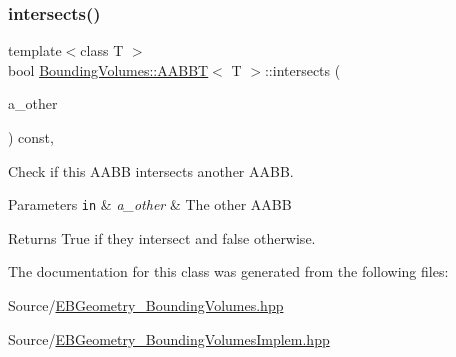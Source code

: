 \subsubsection{\texorpdfstring{intersects()}{intersects()}}
{\footnotesize\ttfamily template$<$class T $>$ \\
bool \hyperlink{classBoundingVolumes_1_1AABBT}{Bounding\+Volumes\+::\+A\+A\+B\+BT}$<$ T $>$\+::intersects (\begin{DoxyParamCaption}\item[{const \hyperlink{classBoundingVolumes_1_1AABBT}{A\+A\+B\+BT}$<$ T $>$ \&}]{a\+\_\+other }\end{DoxyParamCaption}) const\hspace{0.3cm}{\ttfamily [inline]}, {\ttfamily [noexcept]}}



Check if this A\+A\+BB intersects another A\+A\+BB. 


\begin{DoxyParams}[1]{Parameters}
\mbox{\tt in}  & {\em a\+\_\+other} & The other A\+A\+BB \\
\hline
\end{DoxyParams}
\begin{DoxyReturn}{Returns}
True if they intersect and false otherwise. 
\end{DoxyReturn}


The documentation for this class was generated from the following files\+:\begin{DoxyCompactItemize}
\item 
Source/\hyperlink{EBGeometry__BoundingVolumes_8hpp}{E\+B\+Geometry\+\_\+\+Bounding\+Volumes.\+hpp}\item 
Source/\hyperlink{EBGeometry__BoundingVolumesImplem_8hpp}{E\+B\+Geometry\+\_\+\+Bounding\+Volumes\+Implem.\+hpp}\end{DoxyCompactItemize}
